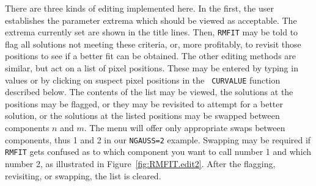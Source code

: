 \documentclass[twoside]{article}
\begin{document}
There are three kinds of editing implemented here.  In the first, the
user establishes the parameter extrema which should be viewed as
acceptable.  The extrema currently set are shown in the title lines.
Then, {\tt RMFIT} may be told to flag all solutions not meeting these
criteria, or, more profitably, to revisit those positions to see if a
better fit can be obtained.  The other editing methods are similar,
but act on a list of pixel positions.  These may be entered by typing
in values or by clicking on suspect pixel positions in the {\tt
  CURVALUE} function described below.  The contents of the list may be
viewed, the solutions at the positions may be flagged, or they may be
revisited to attempt for a better solution, or the solutions at the
listed positions may be swapped between components $n$ and $m$.  The
menu will offer only appropriate swaps between components, thus 1 and
2 in our {\tt NGAUSS=2} example.  Swapping may be required if {\tt
  RMFIT} gets confused as to which component you want to call number 1
and which number 2, as illustrated in Figure~\ref{fig:RMFIT.edit2}.
After the flagging, revisiting, or swapping, the list is cleared.
\vfill\eject
\end{document}
